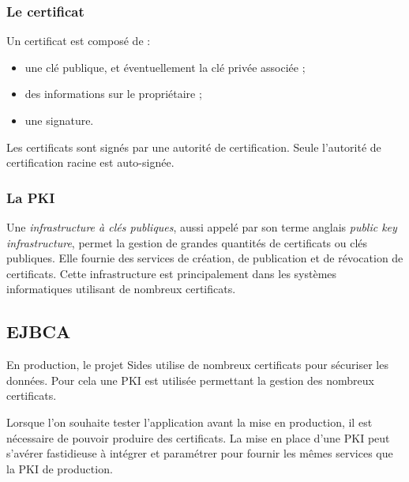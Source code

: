 \subsubsection{Le certificat}

Un certificat est composé de :
\begin{itemize}
	\item une clé publique, et éventuellement la clé privée associée ;
	\item des informations sur le propriétaire ;
	\item une signature.
\end{itemize}

Les certificats sont signés par une autorité de certification.
Seule l'autorité de certification racine est auto-signée.


\subsubsection{La PKI}

Une \textit{infrastructure à clés publiques}, aussi appelé par son terme anglais \textit{public key infrastructure}, permet la gestion de grandes quantités de certificats ou clés publiques.
Elle fournie des services de création, de publication et de révocation de certificats.
Cette infrastructure est principalement dans les systèmes informatiques utilisant de nombreux certificats.


\subsection{EJBCA}

En production, le projet Sides utilise de nombreux certificats pour sécuriser les données.
Pour cela une PKI est utilisée permettant la gestion des nombreux certificats.

Lorsque l'on souhaite tester l'application avant la mise en production, il est nécessaire de pouvoir produire des certificats.
La mise en place d'une PKI peut s'avérer fastidieuse à intégrer et paramétrer pour fournir les mêmes services que la PKI de production.

